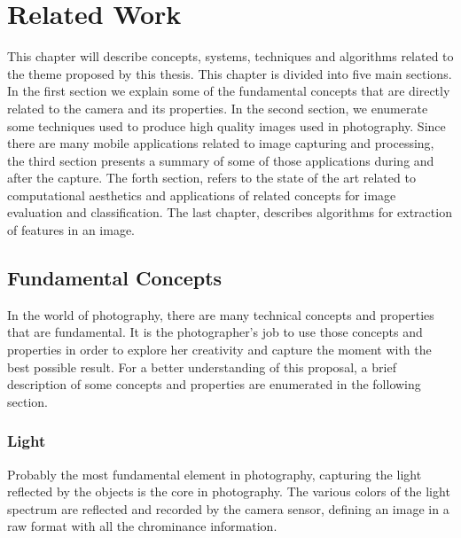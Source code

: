 \chapter{Related Work}
\label{cha:related_work}

This chapter will describe concepts, systems, techniques and algorithms related to the theme proposed by this thesis.
This chapter is divided into five main sections. In the first section we explain some of the fundamental concepts that are directly related to the camera and its properties. In the second section, we enumerate some techniques used to produce high quality images used in photography. Since there are many mobile applications related to image capturing and processing, the third section presents a summary of some of those applications during and after the capture. The forth section, refers to the state of the art related to computational aesthetics and applications of related concepts for image evaluation and classification. The last chapter, describes algorithms for extraction of features in an image.

\section{Fundamental Concepts}
\label{sec:concepts}
In the world of photography, there are many technical concepts and properties that are fundamental. It is the photographer's job to use those concepts and properties in order to explore her creativity and capture the moment with the best possible result.
For a better understanding of this proposal,  a brief description of some concepts and properties are enumerated in the following section.

\subsection{Light}
\label{sub:light}
Probably the most fundamental element in photography, capturing the light reflected by the objects is the core in photography. The various colors of the light spectrum are reflected and recorded by the camera sensor, defining an image in a raw format with all the chrominance information.

